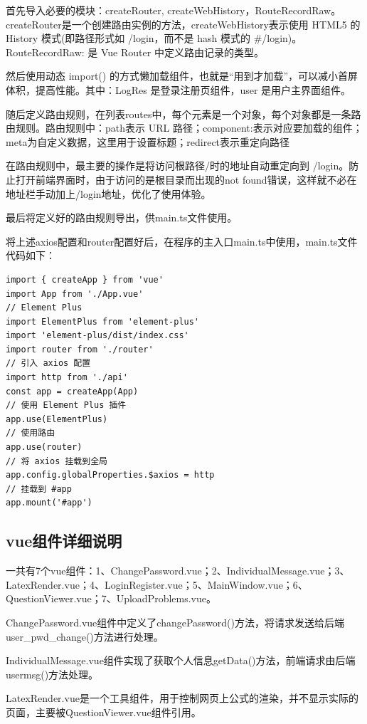 \documentclass[a4paper,AutoFakeBold={2.7}]{ctexart} %
\begin{document}
首先导入必要的模块：createRouter, createWebHistory，RouteRecordRaw。createRouter是一个创建路由实例的方法，createWebHistory表示使用 HTML5 的 History 模式(即路径形式如 /login，而不是 hash 模式的 \#/login)。RouteRecordRaw: 是 Vue Router 中定义路由记录的类型。

然后使用动态 import() 的方式懒加载组件，也就是“用到才加载”，可以减小首屏体积，提高性能。其中：LogRes 是登录注册页组件，user 是用户主界面组件。

随后定义路由规则，在列表routes中，每个元素是一个对象，每个对象都是一条路由规则。路由规则中：path表示 URL 路径；component:表示对应要加载的组件；meta为自定义数据，这里用于设置标题；redirect表示重定向路径

在路由规则中，最主要的操作是将访问根路径/时的地址自动重定向到 /login。防止打开前端界面时，由于访问的是根目录而出现的not found错误，这样就不必在地址栏手动加上/login地址，优化了使用体验。

最后将定义好的路由规则导出，供main.ts文件使用。

将上述axios配置和router配置好后，在程序的主入口main.ts中使用，main.ts文件代码如下：

\begin{lstlisting}
import { createApp } from 'vue'
import App from './App.vue'
// Element Plus
import ElementPlus from 'element-plus'
import 'element-plus/dist/index.css'
import router from './router'
// 引入 axios 配置
import http from './api'
const app = createApp(App)
// 使用 Element Plus 插件
app.use(ElementPlus)
// 使用路由
app.use(router)
// 将 axios 挂载到全局
app.config.globalProperties.$axios = http
// 挂载到 #app
app.mount('#app')
\end{lstlisting}

\subsection{vue组件详细说明}

一共有7个vue组件：1、ChangePassword.vue；2、IndividualMessage.vue；3、LatexRender.vue；4、LoginRegister.vue；5、MainWindow.vue；6、QuestionViewer.vue；7、UploadProblems.vue。

ChangePassword.vue组件中定义了changePassword()方法，将请求发送给后端user\_pwd\_change()方法进行处理。

IndividualMessage.vue组件实现了获取个人信息getData()方法，前端请求由后端usermsg()方法处理。

LatexRender.vue是一个工具组件，用于控制网页上公式的渲染，并不显示实际的页面，主要被QuestionViewer.vue组件引用。
\end{document}

